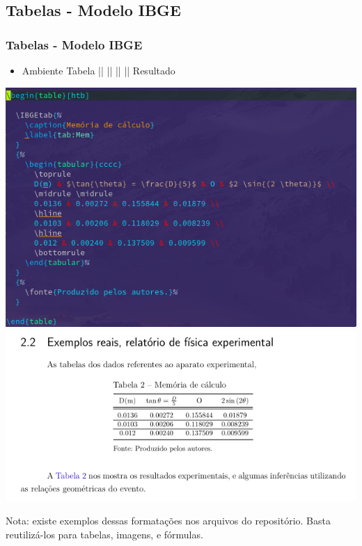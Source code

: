 \documentclass{beamer}
\begin{document}
\begin{frame}
  \section{Tabelas - Modelo IBGE}
  \frametitle{Tabelas - Modelo IBGE}

  \begin{itemize}
  \item Ambiente Tabela || || ||  || Resultado
  \end{itemize}

  \begin{center}
    \includegraphics[scale=0.28]{../Imagens/A2I61.png}
    \includegraphics[scale=0.24]{../Imagens/A2I62.png}
  \end{center}

  \pause

  Nota: existe exemplos dessas formatações nos arquivos do
  repositório. Basta reutilizá-los para tabelas, imagens, e fórmulas.

\end{frame}
\end{document}

